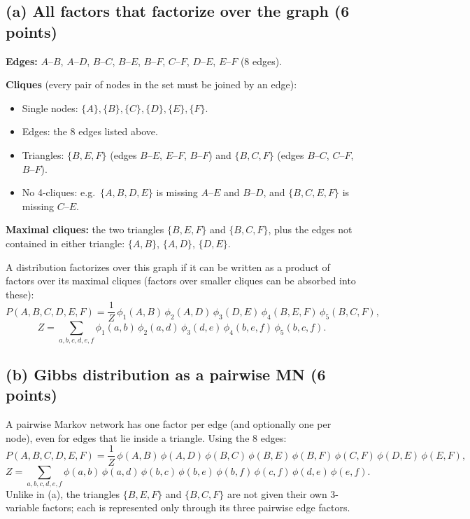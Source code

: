 \documentclass[11pt]{article}
\begin{document}
\subsection*{(a) All factors that factorize over the graph (6 points)}

\textbf{Edges:} $A$--$B$, $A$--$D$, $B$--$C$, $B$--$E$, $B$--$F$, $C$--$F$,
$D$--$E$, $E$--$F$ \quad (8 edges).

\textbf{Cliques} (every pair of nodes in the set must be joined by an edge):
\begin{itemize}
  \item Single nodes: $\{A\}, \{B\}, \{C\}, \{D\}, \{E\}, \{F\}$.
  \item Edges: the 8 edges listed above.
  \item Triangles: $\{B,E,F\}$ (edges $B$--$E$, $E$--$F$, $B$--$F$) and
        $\{B,C,F\}$ (edges $B$--$C$, $C$--$F$, $B$--$F$).
  \item No 4-cliques: e.g.\ $\{A,B,D,E\}$ is missing $A$--$E$ and $B$--$D$,
        and $\{B,C,E,F\}$ is missing $C$--$E$.
\end{itemize}

\textbf{Maximal cliques:} the two triangles $\{B,E,F\}$ and $\{B,C,F\}$, plus
the edges not contained in either triangle: $\{A,B\}$, $\{A,D\}$, $\{D,E\}$.

A distribution factorizes over this graph if it can be written as a product
of factors over its maximal cliques (factors over smaller cliques can be
absorbed into these):
\[
  P(A,B,C,D,E,F) = \frac{1}{Z}\,
  \phi_1(A,B)\,\phi_2(A,D)\,\phi_3(D,E)\,\phi_4(B,E,F)\,\phi_5(B,C,F),
\]
\[
  Z = \sum_{a,b,c,d,e,f}
  \phi_1(a,b)\,\phi_2(a,d)\,\phi_3(d,e)\,\phi_4(b,e,f)\,\phi_5(b,c,f).
\]

\subsection*{(b) Gibbs distribution as a pairwise MN (6 points)}

A pairwise Markov network has one factor per edge (and optionally one
per node), even for edges that lie inside a triangle. Using the 8 edges:
\[
  P(A,B,C,D,E,F) = \frac{1}{Z}\,
  \phi(A,B)\,\phi(A,D)\,\phi(B,C)\,\phi(B,E)\,\phi(B,F)\,\phi(C,F)\,\phi(D,E)\,\phi(E,F),
\]
\[
  Z = \sum_{a,b,c,d,e,f}
  \phi(a,b)\,\phi(a,d)\,\phi(b,c)\,\phi(b,e)\,\phi(b,f)\,\phi(c,f)\,\phi(d,e)\,\phi(e,f).
\]
Unlike in (a), the triangles $\{B,E,F\}$ and $\{B,C,F\}$ are not given their
own 3-variable factors; each is represented only through its three
pairwise edge factors.
\end{document}
